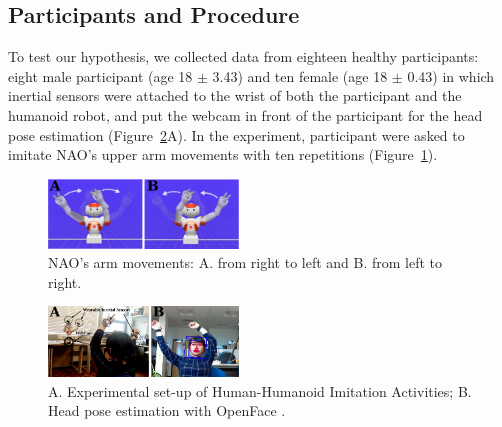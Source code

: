 \documentclass{sigchi}
\begin{document}
\subsection{Participants and Procedure}
To test our hypothesis, we collected data from eighteen healthy participants:
eight male participant (age 18 $\pm$ 3.43) and ten female (age 18 $\pm$ 0.43)
in which inertial sensors were attached to the wrist of both the participant and the
humanoid robot, and put the webcam in front of the participant for the head pose
estimation (Figure~\ref{fig:exp}A).
In the experiment, participant were asked to imitate NAO's upper arm movements
with ten repetitions (Figure~\ref{fig:nao}).
\begin{figure}
\centering
\includegraphics[width=0.45\textwidth]{figures/nao/arm_movements/fignao_v00}
\caption[PA]{NAO's arm movements: A. from right to left and B. from left to right.}
\label{fig:nao}
\end{figure}
\begin{figure}
\centering
\includegraphics[width=0.45\textwidth]{figures/experiment/fig_w619h233_v2}
\caption[PA]{A. Experimental set-up of Human-Humanoid Imitation Activities;
B. Head pose estimation with OpenFace \cite{Baltrusaitis2016}.}
\label{fig:exp}
\end{figure}
\end{document}
